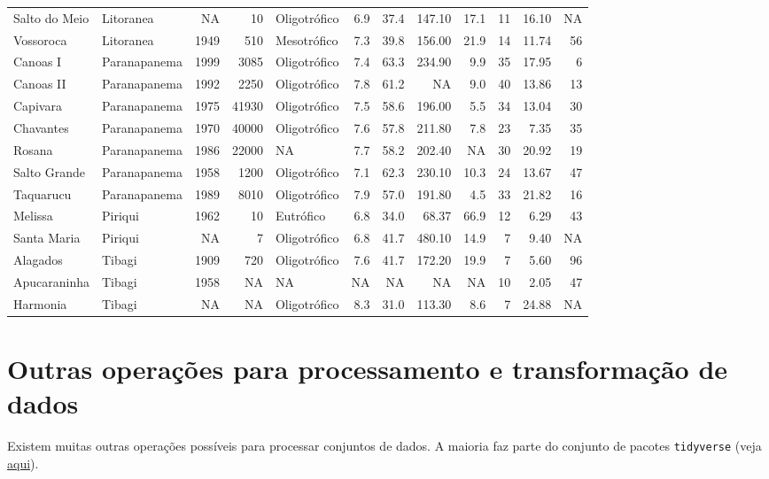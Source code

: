 \documentclass[
]{book}
\begin{document}
\begin{table}
\begin{tabular}{llrrlrrrrrrr}
Salto do Meio & Litoranea & NA & 10 & Oligotrófico & 6.9 & 37.4 & 147.10 & 17.1 & 11 & 16.10 & NA\\
Vossoroca & Litoranea & 1949 & 510 & Mesotrófico & 7.3 & 39.8 & 156.00 & 21.9 & 14 & 11.74 & 56\\
Canoas I & Paranapanema & 1999 & 3085 & Oligotrófico & 7.4 & 63.3 & 234.90 & 9.9 & 35 & 17.95 & 6\\
\addlinespace
Canoas II & Paranapanema & 1992 & 2250 & Oligotrófico & 7.8 & 61.2 & NA & 9.0 & 40 & 13.86 & 13\\
Capivara & Paranapanema & 1975 & 41930 & Oligotrófico & 7.5 & 58.6 & 196.00 & 5.5 & 34 & 13.04 & 30\\
Chavantes & Paranapanema & 1970 & 40000 & Oligotrófico & 7.6 & 57.8 & 211.80 & 7.8 & 23 & 7.35 & 35\\
Rosana & Paranapanema & 1986 & 22000 & NA & 7.7 & 58.2 & 202.40 & NA & 30 & 20.92 & 19\\
Salto Grande & Paranapanema & 1958 & 1200 & Oligotrófico & 7.1 & 62.3 & 230.10 & 10.3 & 24 & 13.67 & 47\\
\addlinespace
Taquarucu & Paranapanema & 1989 & 8010 & Oligotrófico & 7.9 & 57.0 & 191.80 & 4.5 & 33 & 21.82 & 16\\
Melissa & Piriqui & 1962 & 10 & Eutrófico & 6.8 & 34.0 & 68.37 & 66.9 & 12 & 6.29 & 43\\
Santa Maria & Piriqui & NA & 7 & Oligotrófico & 6.8 & 41.7 & 480.10 & 14.9 & 7 & 9.40 & NA\\
Alagados & Tibagi & 1909 & 720 & Oligotrófico & 7.6 & 41.7 & 172.20 & 19.9 & 7 & 5.60 & 96\\
Apucaraninha & Tibagi & 1958 & NA & NA & NA & NA & NA & NA & 10 & 2.05 & 47\\
\addlinespace
Harmonia & Tibagi & NA & NA & Oligotrófico & 8.3 & 31.0 & 113.30 & 8.6 & 7 & 24.88 & NA\\
\bottomrule
\end{tabular}
\endgroup{}
\end{table}

\hypertarget{outras-operauxe7uxf5es-para-processamento-e-transformauxe7uxe3o-de-dados}{%
\section{Outras operações para processamento e transformação de dados}\label{outras-operauxe7uxf5es-para-processamento-e-transformauxe7uxe3o-de-dados}}

Existem muitas outras operações possíveis para processar conjuntos de dados. A maioria faz parte do conjunto de pacotes \texttt{tidyverse} (veja \href{https://fcopf.github.io/probest-introR/format.html}{aqui}).
\end{document}
